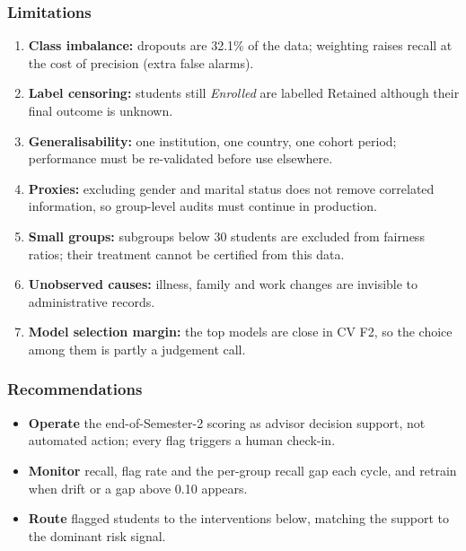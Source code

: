 \documentclass[11pt]{article}
\providecommand{\tightlist}{%
      \setlength{\itemsep}{0pt}\setlength{\parskip}{0pt}}
\begin{document}
\hypertarget{limitations}{%
\subsubsection{Limitations}\label{limitations}}

\begin{enumerate}
\def\labelenumi{\arabic{enumi}.}
\tightlist
\item
  \textbf{Class imbalance:} dropouts are 32.1\% of the data; weighting
  raises recall at the cost of precision (extra false alarms).
\item
  \textbf{Label censoring:} students still \emph{Enrolled} are labelled
  Retained although their final outcome is unknown.
\item
  \textbf{Generalisability:} one institution, one country, one cohort
  period; performance must be re-validated before use elsewhere.
\item
  \textbf{Proxies:} excluding gender and marital status does not remove
  correlated information, so group-level audits must continue in
  production.
\item
  \textbf{Small groups:} subgroups below 30 students are excluded from
  fairness ratios; their treatment cannot be certified from this data.
\item
  \textbf{Unobserved causes:} illness, family and work changes are
  invisible to administrative records.
\item
  \textbf{Model selection margin:} the top models are close in CV F2, so
  the choice among them is partly a judgement call.
\end{enumerate}

\hypertarget{recommendations}{%
\subsubsection{Recommendations}\label{recommendations}}

\begin{itemize}
\tightlist
\item
  \textbf{Operate} the end-of-Semester-2 scoring as advisor decision
  support, not automated action; every flag triggers a human check-in.
\item
  \textbf{Monitor} recall, flag rate and the per-group recall gap each
  cycle, and retrain when drift or a gap above 0.10 appears.
\item
  \textbf{Route} flagged students to the interventions below, matching
  the support to the dominant risk signal.
\end{itemize}
\end{document}
